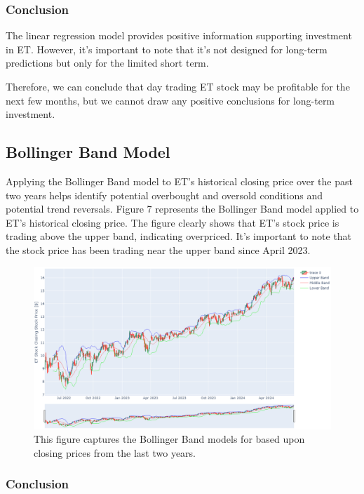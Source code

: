 \documentclass[9pt,a4paper,twoside]{tau}
\begin{document}
        \subsubsection{Conclusion}

        The linear regression model provides positive information supporting investment in ET. However, it's important to note that it's not designed for long-term predictions but only for the limited short term.

        Therefore, we can conclude that day trading ET stock may be profitable for the next few months, but we cannot draw any positive conclusions for long-term investment.

    \subsection{Bollinger Band Model}

        Applying the Bollinger Band model to ET's historical closing price over the past two years helps identify potential overbought and oversold conditions and potential trend reversals. Figure 7 represents the Bollinger Band model applied to ET's historical closing price. The figure clearly shows that ET's stock price is trading above the upper band, indicating overpriced. It's important to note that the stock price has been trading near the upper band since April 2023.

        \begin{figure}[H]
            \centering
            \includegraphics[width=0.85\columnwidth]{Figures/Bollinger_Bands.png}
            \caption{This figure captures the Bollinger Band models for based upon closing prices from the last two years\cite{yahoo-finance-2024}.}
            \label{fig:figure}
        \end{figure}

        \subsubsection{Conclusion}
\end{document}
